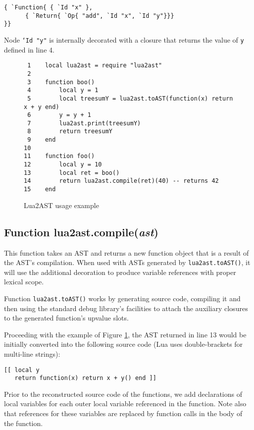 \documentclass[english]{llncs}
\begin{document}
\begin{verbatim}
{ `Function{ { `Id "x" },
      { `Return{ `Op{ "add", `Id "x", `Id "y"}}}
}}
\end{verbatim}

Node \texttt{`Id "y"} is internally decorated with a closure that returns the value of \texttt{y} defined in line 4.

\begin{figure}[t]
\begin{verbatim}
 1    local lua2ast = require "lua2ast"
 2
 3    function boo()
 4        local y = 1
 5        local treesumY = lua2ast.toAST(function(x) return x + y end)
 6        y = y + 1
 7        lua2ast.print(treesumY)
 8        return treesumY
 9    end
10
11    function foo()
12        local y = 10
13        local ret = boo()
14        return lua2ast.compile(ret)(40) -- returns 42
15    end
\end{verbatim}
\protect\caption{\label{fig:Lua2ASTExample}Lua2AST usage example}
\end{figure}

\subsection{Function lua2ast.compile(\emph{ast})}

This function takes an AST and returns a new function object that is a result of the AST's compilation.
When used with ASTs generated by \texttt{lua2ast.toAST()}, it will use the additional
decoration to produce variable references with proper lexical scope.

Function \texttt{lua2ast.toAST()} works by generating source code,
compiling it and then using the standard debug library's
facilities to attach the auxiliary closures to the generated function's
upvalue slots.

Proceeding with the example of Figure \ref{fig:Lua2ASTExample},
the AST returned in line 13 would be initially converted into the
following source code (Lua uses double-brackets for multi-line strings):

\begin{verbatim}
[[ local y
   return function(x) return x + y() end ]]
\end{verbatim}

Prior to the reconstructed source code of the functions,
we add declarations of local variables for each outer local variable
referenced in the function. Note also that references for these
variables are replaced by function calls in the body of the function.
\end{document}
